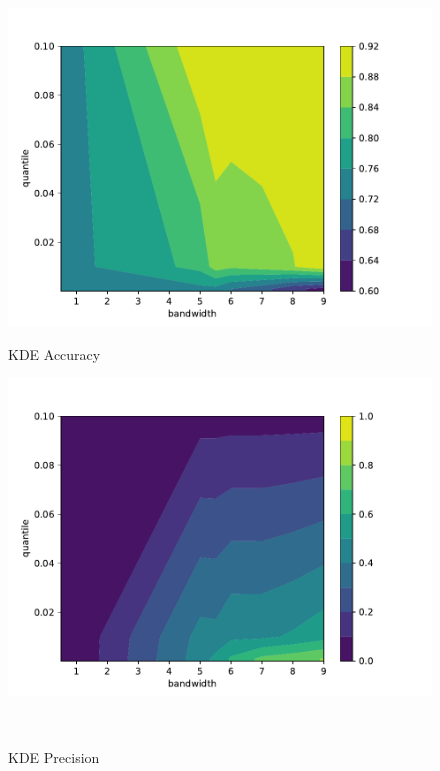 \begin{figure}[p] %
    \begin{minipage}[t]{0.5\textwidth}
        \vspace{0pt}
        \includegraphics[width=\textwidth]{images/kde-accuracy.pdf}
        \caption{KDE Accuracy}
    \end{minipage}
    \hfill
    \begin{minipage}[t]{0.5\textwidth}
        \vspace{0pt}
        \includegraphics[width=\textwidth]{images/kde-precision.pdf}
        \caption{KDE Precision}
    \end{minipage}
    \\

\end{figure}

